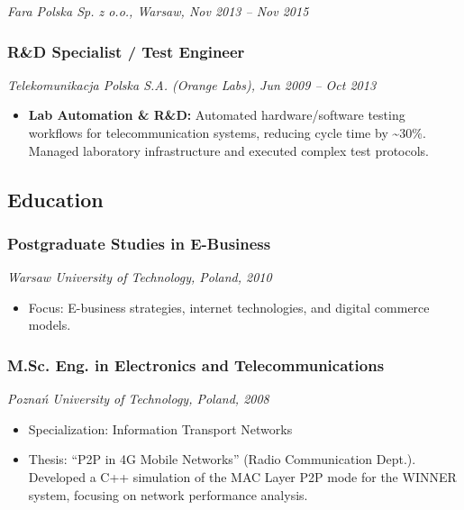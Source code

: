 \documentclass[10pt,a4paper]{article}
\providecommand{\tightlist}{%
  \setlength{\itemsep}{0pt}\setlength{\parskip}{0pt}}
\begin{document}
\emph{Fara Polska Sp. z o.o., Warsaw, Nov 2013 -- Nov 2015}

\subsubsection{R\&D Specialist / Test
Engineer}\label{rd-specialist-test-engineer}

\emph{Telekomunikacja Polska S.A. (Orange Labs), Jun 2009 -- Oct 2013}

\begin{itemize}
\tightlist
\item
  \textbf{Lab Automation \& R\&D:} Automated hardware/software testing
  workflows for telecommunication systems, reducing cycle time by
  \textasciitilde30\%. Managed laboratory infrastructure and executed
  complex test protocols.
\end{itemize}

\subsection{Education}\label{education}

\subsubsection{Postgraduate Studies in
E-Business}\label{postgraduate-studies-in-e-business}

\emph{Warsaw University of Technology, Poland, 2010}

\begin{itemize}
\tightlist
\item
  Focus: E-business strategies, internet technologies, and digital
  commerce models.
\end{itemize}

\subsubsection{M.Sc. Eng. in Electronics and
Telecommunications}\label{m.sc.-eng.-in-electronics-and-telecommunications}

\emph{Poznań University of Technology, Poland, 2008}

\begin{itemize}
\tightlist
\item
  Specialization: Information Transport Networks
\item
  Thesis: ``P2P in 4G Mobile Networks'' (Radio Communication Dept.).
  Developed a C++ simulation of the MAC Layer P2P mode for the WINNER
  system, focusing on network performance analysis.
\end{itemize}
\end{document}
